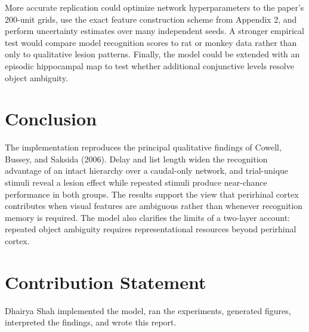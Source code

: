 \documentclass[11pt]{article}
\begin{document}
More accurate replication could optimize network hyperparameters to the paper's 200-unit grids, use the exact feature construction scheme from Appendix 2, and perform uncertainty estimates over many independent seeds. A stronger empirical test would compare model recognition scores to rat or monkey data rather than only to qualitative lesion patterns. Finally, the model could be extended with an episodic hippocampal map to test whether additional conjunctive levels resolve object ambiguity.

\section{Conclusion}
The implementation reproduces the principal qualitative findings of Cowell, Bussey, and Saksida (2006). Delay and list length widen the recognition advantage of an intact hierarchy over a caudal-only network, and trial-unique stimuli reveal a lesion effect while repeated stimuli produce near-chance performance in both groups. The results support the view that perirhinal cortex contributes when visual features are ambiguous rather than whenever recognition memory is required. The model also clarifies the limits of a two-layer account: repeated object ambiguity requires representational resources beyond perirhinal cortex.

\section*{Contribution Statement}
Dhairya Shah implemented the model, ran the experiments, generated figures, interpreted the findings, and wrote this report.
\end{document}
